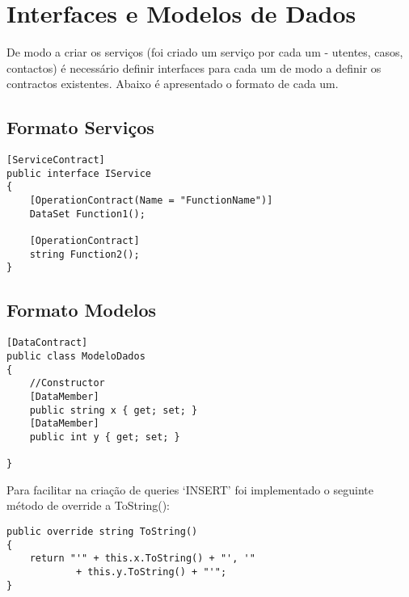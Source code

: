 \section{Interfaces e Modelos de Dados}

De modo a criar os serviços (foi criado um serviço por cada um - utentes, casos, contactos) é necessário definir interfaces para cada um de modo a definir os contractos existentes. Abaixo é apresentado o formato de cada um.

\subsection{Formato Serviços}

\begin{lstlisting}
[ServiceContract]
public interface IService
{
    [OperationContract(Name = "FunctionName")]
    DataSet Function1();
    
    [OperationContract]
    string Function2();
}
\end{lstlisting}

\vfill

\subsection{Formato Modelos}

\begin{lstlisting}
[DataContract]
public class ModeloDados
{
    //Constructor
    [DataMember]
    public string x { get; set; }
    [DataMember]
    public int y { get; set; }

}
\end{lstlisting}

Para facilitar na criação de queries `INSERT' foi implementado o seguinte método de override a ToString(): \\

\begin{lstlisting}
public override string ToString()
{
    return "'" + this.x.ToString() + "', '" 
            + this.y.ToString() + "'";
}
\end{lstlisting}
